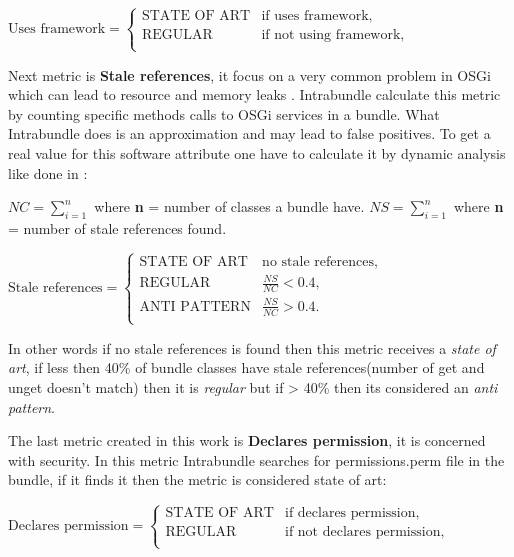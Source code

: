 \(\text{Uses framework}=\begin{cases}
\text{STATE OF ART}& \text{if uses framework},\\
\text{REGULAR}& \text{if not using framework}, \\
\end{cases} \)  \newline

Next metric is \textbf{Stale references}, it focus on a very common problem in OSGi which can lead to resource and memory leaks \citep{Gama 2011}. Intrabundle calculate this metric by counting specific methods calls to OSGi services in a bundle. What Intrabundle does is an approximation and may lead to false positives. To get a real value for this software attribute one have to calculate it by dynamic analysis like done in \citep{Gama 2012}:\newline

\(NC = \sum_{i=1}^{n} \) where \textbf{n} = number of classes a bundle have. \newline
\(NS = \sum_{i=1}^{n} \) where \textbf{n} = number of stale references found. \newline

\(\text{Stale references}=\begin{cases}
\text{STATE OF ART}& \text{no stale references},\\
\text{REGULAR}& \frac{NS}{NC} < 0.4, \\
\text{ANTI PATTERN}& \frac{NS}{NC} > 0.4. \\
\end{cases} \)\newline     

In other words if no stale references is found then this metric receives a \emph{state of art}, if less then 40\% of bundle classes have stale references(number of get and unget doesn't match) then it is \emph{regular} but if > 40\% then its considered an \emph{anti pattern}. 

The last metric created in this work is \textbf{Declares permission}, it is concerned with security. In this metric Intrabundle searches for permissions.perm file in the bundle, if it finds it then the metric is considered state of art: \newline


\(\text{Declares permission}=\begin{cases}
\text{STATE OF ART}& \text{if declares permission},\\
\text{REGULAR}& \text{if not declares permission}, \\
\end{cases} \)  \newline

